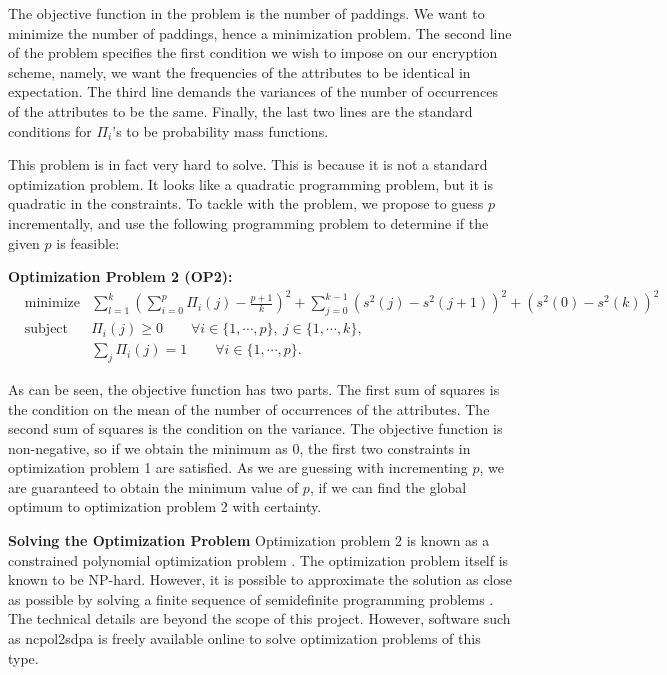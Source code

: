 \documentclass[10pt]{book}
\begin{document}
The objective function in the problem is the number of paddings. We want to minimize the number of paddings, hence a minimization problem. The second line of the problem specifies the first condition we wish to impose on our encryption scheme, namely, we want the frequencies of the attributes to be identical in expectation. The third line demands the variances of the number of occurrences of the attributes to be the same. Finally, the last two lines are the standard conditions for $\Pi_i$'s to be probability mass functions.

This problem is in fact very hard to solve. This is because it is not a standard optimization problem. It looks like a quadratic programming problem, but it is quadratic in the constraints. To tackle with the problem, we propose to guess $p$ incrementally, and use the following programming problem to determine if the given $p$ is feasible:

\textbf{Optimization Problem 2 (OP2):}
\begin{equation*} \label{OP2}
	\begin{aligned}
		& \text{minimize} &\sum_{l = 1}^{k} \left(\sum_{i = 0}^{p} \Pi_i(j) - \frac{p+1}{k}\right)^2  + \sum_{j = 0}^{k-1} \left(s^2(j) - s^2(j+1)\right)^2 + \left(s^2(0) - s^2(k)\right)^2 \\
		& \text{subject to} &\Pi_i(j) \geq 0 \qquad \forall i \in \{1, \cdots, p\}, \  j \in \{1, \cdots, k\}, \\
		&					 &\sum_{j}\Pi_i(j) = 1 \qquad \forall i \in \{1, \cdots, p\}.
	\end{aligned}
\end{equation*}

As can be seen, the objective function has two parts. The first sum of squares is the condition on the mean of the number of occurrences of the attributes. The second sum of squares is the condition on the variance. The objective function is non-negative, so if we obtain the minimum as 0, the first two constraints in optimization problem 1 are satisfied. As we are guessing with incrementing $p$, we are guaranteed to obtain the minimum value of $p$, if we can find the global optimum to optimization problem 2 with certainty.


\textbf{Solving the Optimization Problem} Optimization problem 2 is known as a constrained polynomial optimization problem \cite{Mevissen07introductionto}. The optimization problem itself is known to be NP-hard. However, it is possible to approximate the solution as close as possible by solving a finite sequence of semidefinite programming problems \cite{doi:10.1137/S1052623400366802}. The technical details are beyond the scope of this project. However, software such as ncpol2sdpa \cite{Wittek:2015:A9N:2786970.2699464} is freely available online to solve optimization problems of this type.
\end{document}
